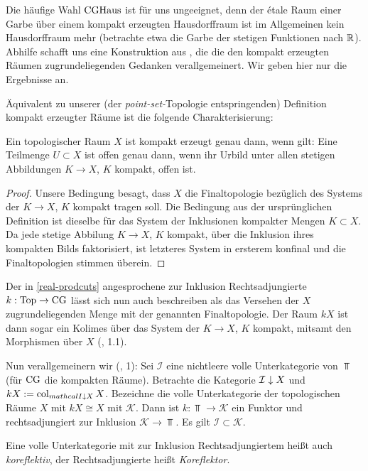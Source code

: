 Die häufige Wahl $\operatorname{CGHaus}$ ist für uns ungeeignet, denn der étale Raum
einer Garbe über einem kompakt erzeugten Hausdorffraum ist im
Allgemeinen kein Hausdorffraum mehr (betrachte etwa die Garbe der
stetigen Funktionen nach $\mathbb{R}$). Abhilfe schafft uns eine Konstruktion
aus \cite{Vogt}, die die den kompakt erzeugten Räumen
zugrundeliegenden Gedanken verallgemeinert. Wir geben hier nur die
Ergebnisse an.

Äquivalent zu unserer (der \emph{point-set-}Topologie entspringenden)
Definition kompakt erzeugter Räume ist die folgende Charakterisierung:
\begin{lemma}
  Ein topologischer Raum $X$ ist kompakt erzeugt genau dann, wenn
  gilt: Eine Teilmenge $U \subset X$ ist offen genau dann, wenn ihr
  Urbild unter allen stetigen Abbildungen $K \to X$, $K$ kompakt,
  offen ist.
\end{lemma}
\begin{proof}
  Unsere Bedingung besagt, dass $X$ die Finaltopologie bezüglich des
  Systems der $K \to X$, $K$ kompakt tragen soll. Die Bedingung aus
  der ursprünglichen Definition ist dieselbe für das System der
  Inklusionen kompakter Mengen $K \subset X$. Da jede stetige Abbilung
  $K \to X$, $K$ kompakt, über die Inklusion ihres kompakten Bilds
  faktorisiert, ist letzteres System in ersterem konfinal und die
  Finaltopologien stimmen überein.
\end{proof}
Der in \ref{real-prodcuts} angesprochene zur Inklusion
Rechtsadjungierte $k: \operatorname{Top} \to \operatorname{CG}$ lässt sich nun auch beschreiben
als das Versehen der $X$ zugrundeliegenden Menge mit der genannten
Finaltopologie. Der Raum $kX$ ist dann sogar ein Kolimes über das
System der $K \to X$, $K$ kompakt, mitsamt den Morphismen über $X$
(\cite{Vogt}, 1.1).

Nun verallgemeinern wir (\cite{Vogt}, 1): Sei $\mathcal{I}$ eine
nichtleere volle Unterkategorie von $\Top$ (für $\operatorname{CG}$ die kompakten
Räume). Betrachte die Kategorie $\mathcal{I} \downarrow \! {\scriptstyle } \, X$ und $kX
:= \operatorname{col}_{mathcal{I} \downarrow \! {\scriptstyle } \, X} X$. Bezeichne die volle
Unterkategorie der topologischen Räume $X$ mit $kX \cong X$ mit
$\mathcal{K}$. Dann ist $k: \Top \to \mathcal{K}$ ein Funktor und
rechtsadjungiert zur Inklusion $\mathcal{K} \to \Top$. Es gilt
$\mathcal{I} \subset \mathcal{K}$.
\begin{bem}
  Eine volle Unterkategorie mit zur Inklusion Rechtsadjungiertem heißt
  auch \emph{koreflektiv}, der Rechtsadjungierte heißt
  \emph{Koreflektor}.
\end{bem}

